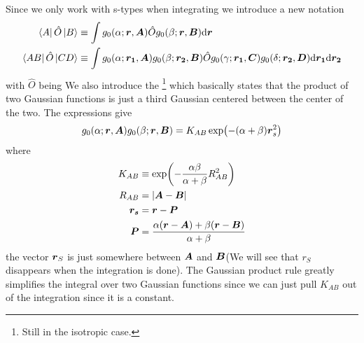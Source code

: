     Since we only work with s-types when integrating we introduce a new notation
        \begin{equation}
            \begin{aligned}
                \bra{A}\hat{O}\ket{B} &\equiv \int g_0(\alpha;\boldsymbol{{r}},\boldsymbol{{A}})
                \hat{O} g_0(\beta;\boldsymbol{{r}},\boldsymbol{{B}}) \mathrm{d}\boldsymbol{{r}}\\
                \bra{AB}\hat{O}\ket{CD} &\equiv \int
                g_0(\alpha;\boldsymbol{{r_1}},\boldsymbol{{A}})g_0(\beta;\boldsymbol{{r_2}},\boldsymbol{{B}})
                \hat{O} g_0(\gamma;\boldsymbol{{r_1}},\boldsymbol{{C}})
                g_0(\delta;\boldsymbol{{r_2}},\boldsymbol{{D}}) \mathrm{d}\boldsymbol{{r_1}} \mathrm{d}\boldsymbol{{r_2}}\\
            \end{aligned}
        \end{equation}
    with $\hat{O}$ being 
    We also introduce the \footnote{Still in the
    isotropic case.} which basically states that the product of two Gaussian
    functions is just a third Gaussian centered between the center of the two.
    The expressions give
        \begin{equation}
            g_0(\alpha;\boldsymbol{{r}},\boldsymbol{{A}})g_0(\beta;\boldsymbol{{r}},\boldsymbol{{B}}) =
            K_{AB}\exp(-(\alpha+\beta)\boldsymbol{{r}}^2_s)
            \label{eq:gaussianProductRule}
        \end{equation}
    where
        \begin{equation}
            \begin{aligned}
                K_{AB} &\equiv \exp(-\frac{\alpha\beta}{\alpha+\beta}R^2_{AB})
                \\
                R_{AB} &= \abs{\boldsymbol{{A}} - \boldsymbol{{B}}} \\
                \boldsymbol{{r_s}} &= \boldsymbol{{r}} - \boldsymbol{{P}} \\
                \boldsymbol{{P}} &= \frac{\alpha(\boldsymbol{{r}}-\boldsymbol{{A}}) +
                \beta(\boldsymbol{{r}}-\boldsymbol{{B}})}{\alpha + \beta}
            \end{aligned}
        \end{equation}
    the vector $\boldsymbol{{r}}_S$ is just somewhere between $\boldsymbol{{A}}$ and
    $\boldsymbol{{B}}$(We will see that $r_S$ disappears when the integration is done).
    The Gaussian product rule greatly simplifies the integral over two Gaussian
    functions since we can just pull $K_{AB}$ out of the integration since it
    is a constant.

